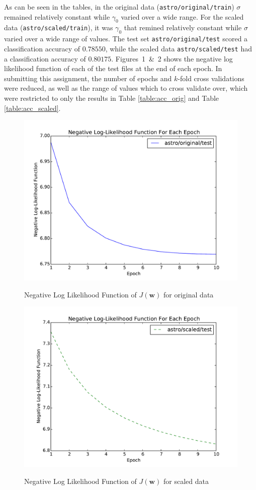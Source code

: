 \documentclass[12pt, fullpage,letterpaper]{article}
\begin{document}
\begin{enumerate}
As can be seen in the tables, in the original data (\verb~astro/original/train~) $\sigma$ remained relatively constant while $\gamma_{0}$ varied over a wide range. For the scaled data (\verb~astro/scaled/train~), it was $\gamma_{0}$ that remined relatively constant while $\sigma$ varied over a wide range of values. The test set \verb~astro/original/test~ scored a classification accuracy of $0.78550$, while the scaled data \verb~astro/scaled/test~ had a classification accuracy of $0.80175$. Figures~1~\&~2 shows the negative log likelihood function of each of the test files at the end of each epoch. In submitting this assignment, the number of epochs and $k$-fold cross validations were reduced, as well as the range of values which to cross validate over, which were restricted to only the results in Table \ref{table:acc_orig} and Table \ref{table:acc_scaled}.

\begin{figure}[!h]
\centering
\includegraphics[width=.5\textwidth]{SGD-results-orig2.pdf}
\label{fig:neg_loger_orig}
\caption{Negative Log Likelihood Function of $J(\mathbf{w})$ for original data}
\end{figure}

\begin{figure}[!h]
\centering
\includegraphics[width=.5\textwidth]{SGD-results-scaled2.pdf}
\label{fig:neg_loger_scaled}
\caption{Negative Log Likelihood Function of $J(\mathbf{w})$ for scaled data}
\end{figure}
\end{enumerate}
\end{document}
